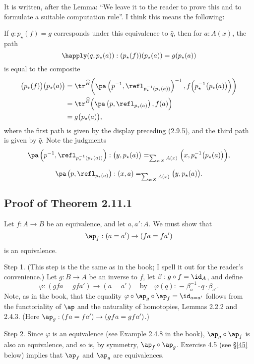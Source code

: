 \documentclass[12pt]{article}
\begin{document}
It is written, after the Lemma: ``We leave it to the reader to prove this and to formulate a suitable computation rule''. I think this means the following:

If $q:p_\star(f)=g$ corresponds under this equivalence to $\widehat q$, then for $a:A(x)$, the path 
$$
\happly(q,p_\star(a)):(p_\star(f))(p_\star(a))=g(p_\star(a))
$$ 
is equal to the composite 
\begin{align*}
\big(p_\star(f)\big)\big(p_\star(a)\big)&=\tr^{\widehat B}\bigg(\pa\left(p^{-1},\refl_{p^{-1}_\star(p_\star(a))}\right)^{-1},f\Big(p^{-1}_\star\big(p_\star(a)\big)\Big)\bigg)\\ 
&=\tr^{\widehat B}\Big(\pa\left(p,\refl_{p_\star(a)}\right),f(a)\Big)\\
&=g\big(p_\star(a)\big),
\end{align*}
where the first path is given by the display preceding (2.9.5), and the third path is given by $\widehat q$. Note the judgments
$$
\pa\left(p^{-1},\refl_{p^{-1}_\star(p_\star(a))}\right):\big(y,p_\star(a)\big)=_{\sum_{x:X}A(x)}\Big(x,p^{-1}_\star\big(p_\star(a)\big)\Big),
$$ 

$$
\pa\left(p,\refl_{p_\star(a)}\right):(x,a)=_{\sum_{x:X}A(x)}\big(y,p_\star(a)\big).
$$ 


\subsection{Proof of Theorem 2.11.1}\label{2111}

Let $f:A\to B$ be an equivalence, and let $a,a':A$. We must show that 
$$
\ap_f:(a=a')\to (fa=fa')
$$ 
is an equivalence.

Step 1. (This step is the the same as in the book; I spell it out for the reader's convenience.) Let $g:B\to A$ be an inverse to $f$, let $\beta:g\circ f=\id_A$, and define 
$$
\varphi:(gfa=gfa')\to(a=a')\quad\text{by}\quad\varphi(q):\equiv\beta_a^{-1}\cdot q\cdot\beta_{a'}.
$$ 
Note, as in the book, that the equality $\varphi\circ\ap_g\circ\ap_f=\id_{a=a'}$ follows from the functoriality of $\ap$ and the naturality of homotopies, Lemmas 2.2.2 and 2.4.3. (Here $\ap_g:(fa=fa')\to (gfa=gfa')$.)

Step 2. Since $\varphi$ is an equivalence (see Example 2.4.8 in the book), $\ap_g\circ\ap_f$ is also an equivalence, and so is, by symmetry, $\ap_f\circ\ap_g$. Exercise 4.5 (see \S\ref{45} below) implies that $\ap_f$ and $\ap_g$ are equivalences.

\end{document}
